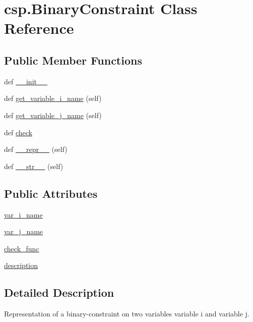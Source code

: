 \hypertarget{classcsp_1_1_binary_constraint}{}\section{csp.\+Binary\+Constraint Class Reference}
\label{classcsp_1_1_binary_constraint}
\subsection*{Public Member Functions}
\begin{DoxyCompactItemize}
\item 
def \hyperlink{classcsp_1_1_binary_constraint_ad7582e800f9f34d68dae23d90261f8d0}{\+\_\+\+\_\+init\+\_\+\+\_\+}
\item 
def \hyperlink{classcsp_1_1_binary_constraint_aa30156c7b8063ccae3028e4f506f6fc2}{get\+\_\+variable\+\_\+i\+\_\+name} (self)
\item 
def \hyperlink{classcsp_1_1_binary_constraint_a933562991c6baebb5b5264ed3c8d641c}{get\+\_\+variable\+\_\+j\+\_\+name} (self)
\item 
def \hyperlink{classcsp_1_1_binary_constraint_a60ad1bf7ae317b370fe91d763b5e8cb0}{check}
\item 
def \hyperlink{classcsp_1_1_binary_constraint_abd1037cf01a9cb0f6bbf24296045f19e}{\+\_\+\+\_\+repr\+\_\+\+\_\+} (self)
\item 
def \hyperlink{classcsp_1_1_binary_constraint_ad3ab0eb66415031545a6898c0110fdc6}{\+\_\+\+\_\+str\+\_\+\+\_\+} (self)
\end{DoxyCompactItemize}
\subsection*{Public Attributes}
\begin{DoxyCompactItemize}
\item 
\hyperlink{classcsp_1_1_binary_constraint_aa951bc2855e453270f5f28ba829636c5}{var\+\_\+i\+\_\+name}
\item 
\hyperlink{classcsp_1_1_binary_constraint_a4e917e6acb014116c86a11aa94f98757}{var\+\_\+j\+\_\+name}
\item 
\hyperlink{classcsp_1_1_binary_constraint_a7b43cf5ee6cd9aa0ea6a75b5b69f17b1}{check\+\_\+func}
\item 
\hyperlink{classcsp_1_1_binary_constraint_aaab7a705fdfae23b58a5346d3c846f12}{description}
\end{DoxyCompactItemize}


\subsection{Detailed Description}
\begin{DoxyVerb}Representation of a binary-constraint on two variables variable i and
variable j.
\end{DoxyVerb}
 

